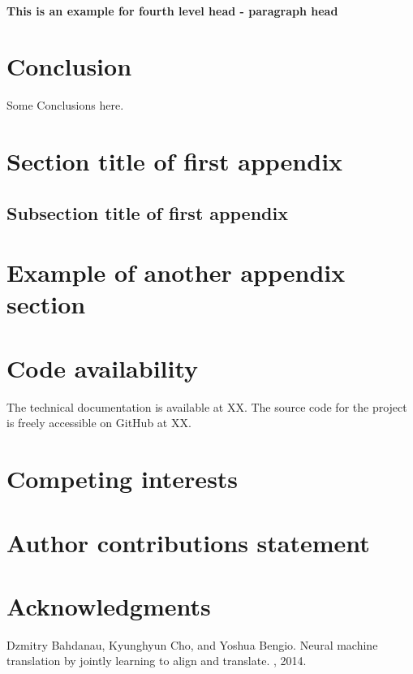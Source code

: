 \documentclass[unnumsec,webpdf,contemporary,large]{oup-authoring-template}%
\theoremstyle{thmstyleone}%
\theoremstyle{thmstyletwo}%
\theoremstyle{thmstylethree}%
\begin{document}
\paragraph{This is an example for fourth level head - paragraph head}

\section{Conclusion}

Some Conclusions here.


\begin{appendices}

\section{Section title of first appendix}\label{sec11}

\subsection{Subsection title of first appendix}\label{subsec4}

\section{Example of another appendix section}\label{sec13}%

\end{appendices}

\section{Code availability}
The technical documentation is available at XX. The source code for the project is freely accessible on GitHub at XX.

\section{Competing interests}

\section{Author contributions statement}

\section{Acknowledgments}



\begin{thebibliography}{10}
Dzmitry Bahdanau, Kyunghyun Cho, and Yoshua Bengio.
\newblock Neural machine translation by jointly learning to align and
  translate.
, 2014.
\end{thebibliography}
\end{document}
